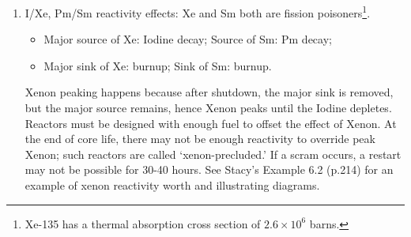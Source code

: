 \documentclass{school-22.211-notes}
\begin{document}
\begin{enumerate}
\item I/Xe, Pm/Sm reactivity effects: Xe and Sm both are fission poisoners\footnote{Xe-135 has a thermal absorption cross section of $2.6\times 10^6$ barns.}. 
\begin{itemize}
\item Major source of Xe: Iodine decay; Source of Sm: Pm decay;
\item Major sink of Xe: burnup; Sink of Sm: burnup. 
\end{itemize}
Xenon peaking happens because after shutdown, the major sink is removed, but the major source remains, hence Xenon peaks until the Iodine depletes. Reactors must be designed with enough fuel to offset the effect of Xenon. At the end of core life, there may not be enough reactivity to override peak Xenon; such reactors are called `xenon-precluded.' If a scram occurs, a restart may not be possible for 30-40 hours. See Stacy's Example 6.2 (p.214) for an example of xenon reactivity worth and illustrating diagrams. 



\end{enumerate}
\end{document}
